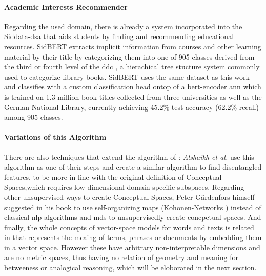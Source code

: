 \paragraph{Academic Interests Recommender}
\label{sec:sidbert}
Regarding the used domain, there is already a system incorporated into the Siddata-\gls{dsa} that aids students by finding and recommending educational resources. SidBERT \cite{Schrumpf2021DELPHI} extracts implicit information from courses and other learning material by their title by categorizing them into one of 905 classes derived from the third or fourth level of the \gls{ddc} \cite{Dewey1876}, a hierachical tree stucture system commonly used to categorize library books. SidBERT uses the same dataset as this work and classifies with a custom classification head ontop of a \gls{bert}-encoder \gls{ann} which is trained on 1.3 million book titles collected from three universities as well as the German National Library, currently achieving 45.2\% test accuracy (62.2\% recall) among 905 classes.

\paragraph{Variations of this Algorithm}

There are also techniques that extend the algorithm of \textcite{Derrac2015}: \textit{Alshaikh et al.} \cite{Alshaikh2019, Alshaikh2021} use this algorithm as one of their steps and create a similar algorithm to find disentangled features, to be more in line with the original definition of Conceptual Spaces,which requires low-dimensional domain-specific subspaces. Regarding other unsupervised ways to create Conceptual Spaces, Peter Gärdenfors himself suggested in his book \cite{Gardenfors2000a} to use self-organizing maps (Kohonen-Networks \cite{Kohonen1997}) instead of classical \gls{nlp} algorithms and \gls{mds} to unsupervisedly create concpetual spaces. And finally, the whole concepts of vector-space models for words \cite{Mikolov2013} and texts \cite{Le2014,Devlin2019} is related in that represents the meaing of terms, phrases or documents by embedding them in a vector space. However these have arbitrary non-interpretable dimensions and are no metric spaces, thus having no relation of geometry and meaning for \eg betweeness or analogical reasoning, which will be eloborated in the next section.















